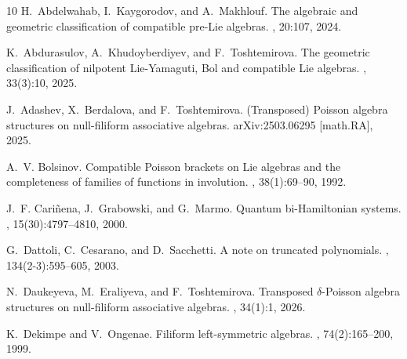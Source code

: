 \documentclass{jonasart}
\begin{document}
    {\footnotesize
        \begin{thebibliography}{10}
            H.~{A}bdelwahab, I.~{K}aygorodov, and A.~{M}akhlouf.
            \newblock The algebraic and geometric classification of compatible {p}re-Lie {a}lgebras.
            , 20:107, 2024.
            
            K.~Abdurasulov, A.~{K}hudoyberdiyev, and F.~{T}oshtemirova.
            \newblock The geometric classification of nilpotent {L}ie-{Y}amaguti, {B}ol and compatible {L}ie algebras.
            , 33(3):10, 2025.
            
            J.~Adashev, X.~Berdalova, and F.~Toshtemirova.
            \newblock ({T}ransposed) {P}oisson algebra structures on null-filiform associative algebras.
            \newblock arXiv:2503.06295 [math.RA], 2025.
            
            A.~V. Bolsinov.
            \newblock Compatible {P}oisson brackets on {L}ie algebras and the completeness of families of functions in involution.
            , 38(1):69--90, 1992.
 
            J.~F. Cari\~{n}ena, J.~Grabowski, and G.~Marmo.
            \newblock Quantum bi-{H}amiltonian systems.
            , 15(30):4797--4810, 2000.
            
            G.~Dattoli, C.~{C}esarano, and D.~{S}acchetti.
            \newblock A note on truncated polynomials.
            , 134(2-3):595–605, 2003.
            
            N.~Daukeyeva, M.~{E}raliyeva, and F.~{T}oshtemirova.
            \newblock Transposed $\delta$-Poisson algebra structures on null-filiform associative algebras.
            , 34(1):1, 2026.
            
            K.~Dekimpe and V.~{O}ngenae.
            \newblock Filiform left-symmetric algebras.
            , 74(2):165–200, 1999.
            

\end{thebibliography}}
\end{document}
